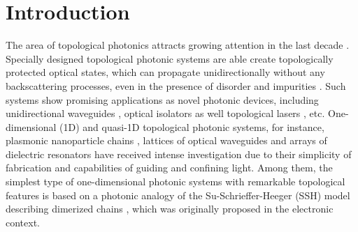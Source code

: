 \documentclass[aps,pra,reprint,groupedaddress,nofootinbib,longbibliography,showpacs]{revtex4-1}
\begin{document}
\section{Introduction}
The area of topological photonics attracts growing attention in the last decade \cite{luNPhoton2014,khanikaevNPhoton2017,ozawa2018topological}. Specially designed topological photonic systems are able create topologically protected optical states, which can propagate unidirectionally without any backscattering processes, even in the presence of disorder and impurities \cite{luNPhoton2014,khanikaevNPhoton2017,ozawa2018topological}. Such systems show promising applications as novel photonic devices, including unidirectional waveguides \cite{poliNComms2015}, optical isolators \cite{el-GanainyOL2015} as well topological lasers \cite{partoPRL2018}, etc. One-dimensional (1D) and quasi-1D topological photonic systems, for instance, plasmonic nanoparticle chains \cite{lingOE2015,downingPRB2017}, lattices of optical waveguides \cite{longhiOL2013,blanco-RedondoPRL2016} and arrays of dielectric resonators \cite{poliNComms2015} have received intense investigation due to their simplicity of fabrication and capabilities of guiding and confining light.  Among them, the simplest type of one-dimensional photonic systems with remarkable topological features is based on a photonic analogy of the Su-Schrieffer-Heeger (SSH) model describing dimerized chains \cite{asboth2016short,longhiOL2013,poliNComms2015,lingOE2015,dengOL2016,blanco-RedondoPRL2016,meierNC2016,downingPRB2017,partoPRL2018}, which was originally proposed in the electronic context. 
\end{document}
